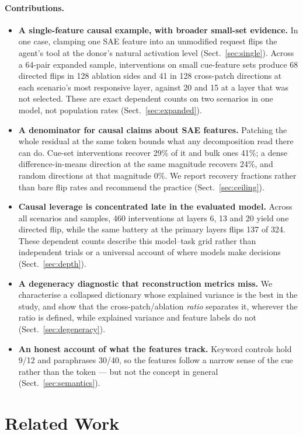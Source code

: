 \documentclass{article}
\begin{document}
\paragraph{Contributions.}
\begin{itemize}
\item \textbf{A single-feature causal example, with broader small-set evidence.} In one case, clamping one SAE feature into an unmodified request flips the agent's tool at the donor's natural activation level (Sect.~\ref{sec:single}). Across a 64-pair expanded sample, interventions on small cue-feature sets produce 68 directed flips in 128 ablation sides and 41 in 128 cross-patch directions at each scenario's most responsive layer, against 20 and 15 at a layer that was not selected. These are exact dependent counts on two scenarios in one model, not population rates (Sect.~\ref{sec:expanded}).
\item \textbf{A denominator for causal claims about SAE features.} Patching the whole residual at the same token bounds what any decomposition read there can do. Cue-set interventions recover 29\% of it and bulk ones 41\%; a dense difference-in-means direction at the same magnitude recovers 24\%, and random directions at that magnitude 0\%. We report recovery fractions rather than bare flip rates and recommend the practice (Sect.~\ref{sec:ceiling}).
\item \textbf{Causal leverage is concentrated late in the evaluated model.} Across all scenarios and samples, 460 interventions at layers 6, 13 and 20 yield one directed flip, while the same battery at the primary layers flips 137 of 324. These dependent counts describe this model--task grid rather than independent trials or a universal account of where models make decisions (Sect.~\ref{sec:depth}).
\item \textbf{A degeneracy diagnostic that reconstruction metrics miss.} We characterise a collapsed dictionary whose explained variance is the best in the study, and show that the cross-patch/ablation \emph{ratio} separates it, wherever the ratio is defined, while explained variance and feature labels do not (Sect.~\ref{sec:degeneracy}).
\item \textbf{An honest account of what the features track.} Keyword controls hold 9/12 and paraphrases 30/40, so the features follow a narrow sense of the cue rather than the token --- but not the concept in general (Sect.~\ref{sec:semantics}).
\end{itemize}

\section{Related Work}
\label{sec:related}
\end{document}
